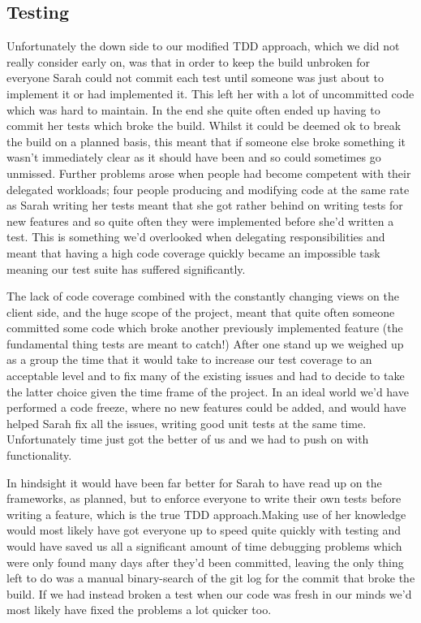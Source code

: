 \subsection{Testing}
  Unfortunately the down side to our modified TDD approach, which we did not really consider early on, was that in order to keep the build unbroken for everyone Sarah could not commit each test until someone was just about to implement it or had implemented it. This left her with a lot of uncommitted code which was hard to maintain. In the end she quite often ended up having to commit her tests which broke the build. Whilst it could be deemed ok to break the build on a planned basis, this meant that if someone else broke something it wasn't immediately clear as it should have been and so could sometimes go unmissed. Further problems arose when people had become competent with their delegated workloads; four people producing and modifying code at the same rate as Sarah writing her tests meant that she got rather behind on writing tests for new features and so quite often they were implemented before she'd written a test. This is something we'd overlooked when delegating responsibilities and meant that having a high code coverage quickly became an impossible task meaning our test suite has suffered significantly.

  The lack of code coverage combined with the constantly changing views on the client side, and the huge scope of the project, meant that quite often someone committed some code which broke another previously implemented feature (the fundamental thing tests are meant to catch!) After one stand up we weighed up as a group the time that it would take to increase our test coverage to an acceptable level and to fix many of the existing issues and had to decide to take the latter choice given the time frame of the project. In an ideal world we'd have performed a code freeze, where no new features could be added, and would have helped Sarah fix all the issues, writing good unit tests at the same time. Unfortunately time just got the better of us and we had to push on with functionality.

  In hindsight it would have been far better for Sarah to have read up on the frameworks, as planned, but to enforce everyone to write their own tests before writing a feature, which is the true TDD approach.Making use of her knowledge would most likely have got everyone up to speed quite quickly with testing and would have saved us all a significant amount of time debugging problems which were only found many days after they'd been committed, leaving the only thing left to do was a manual binary-search of the git log for the commit that broke the build. If we had instead broken a test when our code was fresh in our minds we'd most likely have fixed the problems a lot quicker too.